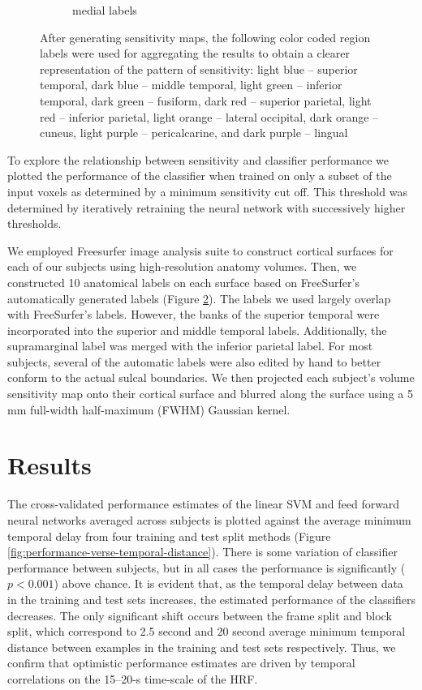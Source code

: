 \documentclass[review,1p,authoryear]{elsarticle}
\begin{document}
\begin{figure}
\begin{subfigure}{0.3\textwidth}
\caption{medial labels}
\label{fig:medial-labels}
\end{subfigure}
\caption{After generating sensitivity maps, the following color coded region labels were used for aggregating the results to obtain a clearer representation of the pattern of sensitivity: light blue -- superior temporal, dark blue -- middle temporal, light green -- inferior temporal, dark green -- fusiform, dark red -- superior parietal, light red -- inferior parietal, light orange -- lateral occipital, dark orange -- cuneus, light purple -- pericalcarine, and dark purple -- lingual}
\label{fig:labels}
\end{figure}

To  explore the relationship between sensitivity and classifier performance we plotted the performance of the classifier when trained on only a subset of the input voxels as determined by a minimum sensitivity cut off.
This threshold was determined by iteratively retraining the neural network with successively higher thresholds.

We employed Freesurfer image analysis suite to construct cortical surfaces for each of our subjects using high-resolution anatomy volumes.
Then, we constructed 10 anatomical labels on each surface based on FreeSurfer's automatically generated labels (Figure \ref{fig:labels}).
The labels we used largely overlap with FreeSurfer's labels.
However, the banks of the superior temporal were incorporated into the superior and middle temporal labels.
Additionally, the supramarginal label was merged with the inferior parietal label.
For most subjects, several of the automatic labels were also edited by hand to better conform to the actual sulcal boundaries.
We then projected each subject's volume sensitivity map onto their cortical surface and blurred along the surface using a 5 mm full-width half-maximum (FWHM) Gaussian kernel.

\section{Results}
The cross-validated performance estimates of the linear SVM and feed forward neural networks averaged across subjects is plotted against the average minimum temporal delay from four training and test split methods (Figure \ref{fig:performance-verse-temporal-distance}).
There is some variation of classifier performance between subjects, but in all cases the performance is significantly ($p < 0.001$) above chance. 
It is evident that, as the temporal delay between data in the training and test sets increases, the estimated performance of the classifiers decreases.
The only significant shift occurs between the frame split and block split, which correspond to 2.5 second and 20 second average minimum temporal distance between examples in the training and test sets respectively.
Thus, we confirm that optimistic performance estimates are driven by temporal correlations on the 15--20-s time-scale of the HRF.
\end{document}
